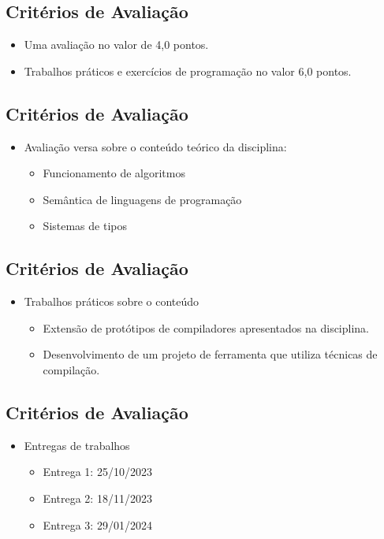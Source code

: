 \documentclass[11pt]{article}
\begin{document}
\subsection*{Critérios de Avaliação}
\label{sec:orgdc60792}

\begin{itemize}
\item Uma avaliação no valor de 4,0 pontos.

\item Trabalhos práticos e exercícios de programação no valor 6,0 pontos.
\end{itemize}
\subsection*{Critérios de Avaliação}
\label{sec:org710d82c}

\begin{itemize}
\item Avaliação versa sobre o conteúdo teórico da disciplina:
\begin{itemize}
\item Funcionamento de algoritmos
\item Semântica de linguagens de programação
\item Sistemas de tipos
\end{itemize}
\end{itemize}
\subsection*{Critérios de Avaliação}
\label{sec:orgc9ef4a1}

\begin{itemize}
\item Trabalhos práticos sobre o conteúdo
\begin{itemize}
\item Extensão de protótipos de compiladores apresentados na disciplina.
\item Desenvolvimento de um projeto de ferramenta que utiliza técnicas de
compilação.
\end{itemize}
\end{itemize}
\subsection*{Critérios de Avaliação}
\label{sec:orgdb04819}

\begin{itemize}
\item Entregas de trabalhos
\begin{itemize}
\item Entrega 1: 25/10/2023
\item Entrega 2: 18/11/2023
\item Entrega 3: 29/01/2024
\end{itemize}
\end{itemize}
\end{document}
